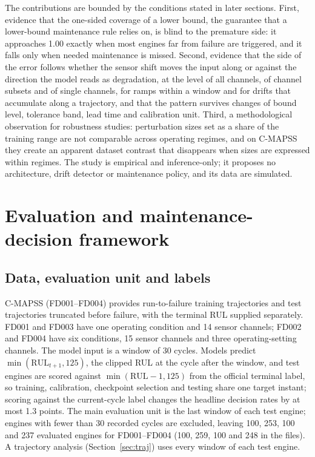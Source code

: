 \documentclass[11pt,a4paper]{article}
\newcommand{\JEvalEng}{100, 253, 100 and 237}
\newcommand{\JFileEng}{100, 259, 100 and 248}
\newcommand{\JLabelHeadline}{1.3}
\begin{document}
The contributions are bounded by the conditions stated in later sections. First, evidence that the one-sided coverage of a lower bound, the guarantee that a lower-bound maintenance rule relies on, is blind to the premature side: it approaches 1.00 exactly when most engines far from failure are triggered, and it falls only when needed maintenance is missed. Second, evidence that the side of the error follows whether the sensor shift moves the input along or against the direction the model reads as degradation, at the level of all channels, of channel subsets and of single channels, for ramps within a window and for drifts that accumulate along a trajectory, and that the pattern survives changes of bound level, tolerance band, lead time and calibration unit. Third, a methodological observation for robustness studies: perturbation sizes set as a share of the training range are not comparable across operating regimes, and on C-MAPSS they create an apparent dataset contrast that disappears when sizes are expressed within regimes. The study is empirical and inference-only; it proposes no architecture, drift detector or maintenance policy, and its data are simulated.

\section{Evaluation and maintenance-decision framework}\label{sec:framework}
\subsection{Data, evaluation unit and labels}
C-MAPSS (FD001--FD004)\cite{saxena2008} provides run-to-failure training trajectories and test trajectories truncated before failure, with the terminal RUL supplied separately. FD001 and FD003 have one operating condition and 14 sensor channels; FD002 and FD004 have six conditions, 15 sensor channels and three operating-setting channels. The model input is a window of 30 cycles. Models predict $\min(\mathrm{RUL}_{t+1},125)$, the clipped RUL at the cycle after the window, and test engines are scored against $\min(\mathrm{RUL}-1,125)$ from the official terminal label, so training, calibration, checkpoint selection and testing share one target instant; scoring against the current-cycle label changes the headline decision rates by at most \JLabelHeadline{} points. The main evaluation unit is the last window of each test engine; engines with fewer than 30 recorded cycles are excluded, leaving \JEvalEng{} evaluated engines for FD001--FD004 (\JFileEng{} in the files). A trajectory analysis (Section~\ref{sec:traj}) uses every window of each test engine.
\end{document}
